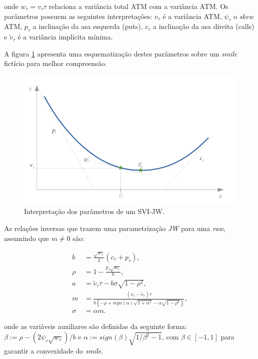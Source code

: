 \documentclass[]{book}
\theoremstyle{definition}
\theoremstyle{definition}
\theoremstyle{definition}
\theoremstyle{remark}
\begin{document}
onde \(w_\tau=v_\tau \tau\) relaciona a variância total ATM com a variância ATM. Os parâmetros possuem as seguintes interpretações: \(v_\tau\) é a variância ATM, \(\psi_\tau\) o \emph{skew} ATM, \(p_\tau\) a inclinação da asa esquerda (puts), \(c_\tau\) a inclinação da asa direita (calls) e \(\tilde v_\tau\) é a variância implícita mínima.

A figura \ref{fig:svi-jw} apresenta uma esquematização destes parâmetros sobre um \emph{smile} fictício para melhor compreensão.

\begin{figure}
\centering
\includegraphics{./images/svi_jw.png}
\caption{\label{fig:svi-jw}Interpretação dos parâmetros de um SVI-JW.}
\end{figure}

As relações inversas que trazem uma parametrização \emph{JW} para uma \emph{raw}, assumindo que \(m \neq 0\) são:

\begin{align}
b&=\frac{\sqrt{w_\tau}}{2}(c_\tau+p_\tau),\\
\rho&=1-\frac{p_\tau\sqrt{w_\tau}}{b},\\
a&=\tilde v_\tau \tau-b\sigma\sqrt{1-\rho^2},\\
m&=\frac{(v_\tau-\tilde v_\tau)\tau}{b\left\lbrace-\rho+sign(\alpha)\sqrt{1+\alpha^2}-\alpha\sqrt{1-\rho^2}\right\rbrace},\\
\sigma&=\alpha m.
\label{eq:jw-to-raw}
\end{align}

onde as variáveis auxiliares são definidas da seguinte forma: \(\beta:=\rho-(2\psi_\tau\sqrt{w_\tau})/b\) e \(\alpha:=sign(\beta)\sqrt{1/\beta^2 - 1}\), com \(\beta \in [-1, 1]\) para garantir a convexidade do \emph{smile}.
\end{document}
